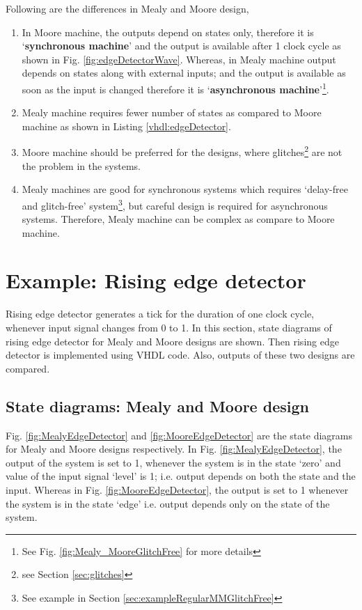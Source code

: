 \begin{noNumBox}
Following are the differences in Mealy and Moore design, 
\begin{enumerate}
	\item In Moore machine, the outputs depend on states only, therefore it is `\textbf{synchronous machine}' and the output is available after 1 clock cycle as shown in Fig. \ref{fig:edgeDetectorWave}. Whereas, in Mealy machine output depends on states along with external inputs; and the output is available as soon as the input is changed therefore it is `\textbf{asynchronous machine}'\footnote{See Fig. \ref{fig:Mealy_MooreGlitchFree} for more details}.
	\item Mealy machine requires fewer number of states as compared to Moore machine as shown in Listing \ref{vhdl:edgeDetector}. 	
	\item Moore machine should be preferred for the designs, where glitches\footnote{see Section \ref{sec:glitches}} are not the problem in the systems. 
	\item Mealy machines are good for synchronous systems which requires `delay-free and glitch-free' system\footnote{See example in Section \ref{sec:exampleRegularMMGlitchFree}}, but careful design is required for asynchronous systems. Therefore, Mealy machine can be complex as compare to Moore machine. 
\end{enumerate}
\end{noNumBox}	

\section{Example: Rising edge detector} \label{sec:FSMExample}
Rising edge detector generates a tick for the duration of one clock cycle, whenever input signal changes from 0 to 1. In this section, state diagrams of rising edge detector for Mealy and Moore designs are shown. Then rising edge detector is implemented using VHDL code. Also, outputs of these two designs are compared. 

\subsection{State diagrams: Mealy and Moore design}
Fig. \ref{fig:MealyEdgeDetector} and \ref{fig:MooreEdgeDetector} are the state diagrams for Mealy and Moore designs respectively. In Fig. \ref{fig:MealyEdgeDetector}, the output of the system is set to 1, whenever the system is in the state `zero' and value of the input signal `level' is 1; i.e. output depends on both the state and the input. Whereas in Fig. \ref{fig:MooreEdgeDetector}, the output is set to 1 whenever the system is in the state `edge' i.e. output depends only on the state of the system. 

